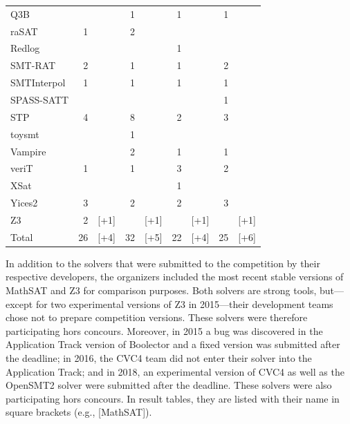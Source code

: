 \documentclass[dvipsnames,table,twoside,11pt]{article}
\newcommand{\apptrack}{Application Track\xspace}
\begin{document}
\begin{table}
\begin{tabular}{lr@{\,\,}rr@{\,\,}rr@{\,\,}rr@{\,\,}r}
    Q3B               &    &      &  1 &      &  1 &      &  1 &      \\
    raSAT             &  1 &      &  2 &      &    &      &    &      \\
    Redlog            &    &      &    &      &  1 &      &    &      \\
    SMT-RAT           &  2 &      &  1 &      &  1 &      &  2 &      \\
    SMTInterpol       &  1 &      &  1 &      &  1 &      &  1 &      \\
    SPASS-SATT        &    &      &    &      &    &      &  1 &      \\
    STP               &  4 &      &  8 &      &  2 &      &  3 &      \\
    toysmt            &    &      &  1 &      &    &      &    &      \\
    Vampire           &    &      &  2 &      &  1 &      &  1 &      \\
    veriT             &  1 &      &  1 &      &  3 &      &  2 &      \\
    XSat              &    &      &    &      &  1 &      &    &      \\
    Yices2            &  3 &      &  2 &      &  2 &      &  3 &      \\
    Z3                &  2 & [+1] &    & [+1] &    & [+1] &    & [+1] \\
    \midrule
    Total             & 26 & [+4] & 32 & [+5] & 22 & [+4] & 25 & [+6] \\
    \bottomrule
  \end{tabular}
\end{table}

In addition to the solvers that were submitted to the competition by
their respective developers, the organizers included the most recent
stable versions of MathSAT and Z3 for comparison purposes.  Both
solvers are strong tools, but---except for two experimental versions
of Z3 in 2015---their development teams chose not to prepare
competition versions.  These solvers were therefore participating hors
concours.  Moreover, in 2015 a bug was discovered in the \apptrack
version of Boolector and a fixed version was submitted after the
deadline; in 2016, the CVC4 team did not enter their solver into the
\apptrack; and in 2018, an experimental version of CVC4 as
well as the OpenSMT2 solver were submitted after the deadline.  These
solvers were also participating hors concours.  In result tables, they
are listed with their name in square brackets (e.g., [MathSAT]).
\end{document}
